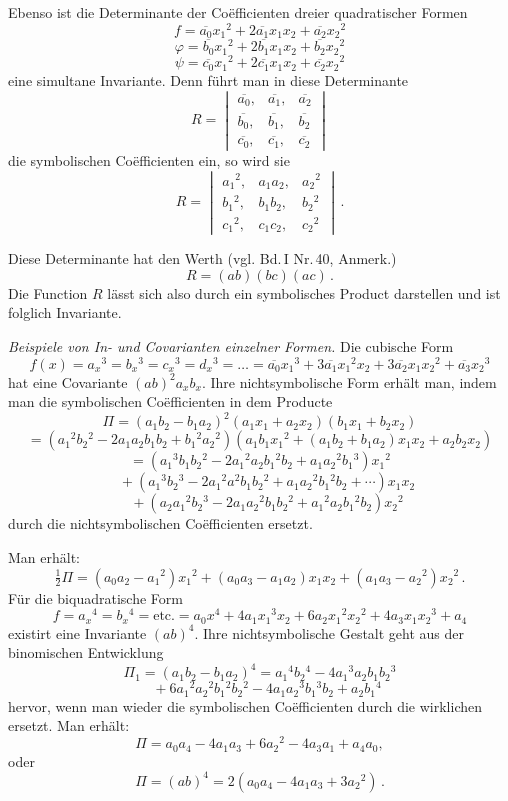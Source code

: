 Ebenso ist die Determinante der Co\"efficienten dreier
quadratischer Formen
\[
f = \overline{a_0}x_1{}^2+2\overline{a_1}x_1x_2+\overline{a_2}x_2{}^2
\]
\[
\varphi = \overline{b_0}x_1{}^2+2\overline{b_1}x_1x_2+\overline{b_2}x_2{}^2
\]
\[
\psi = \overline{c_0}x_1{}^2+2\overline{c_1}x_1x_2+\overline{c_2}x_2{}^2
\]
eine simultane Invariante. Denn führt man in diese Determinante
\[
R = \begin{vmatrix}
\overline{a_0}, & \overline{a_1}, & \overline{a_2}\\
\overline{b_0}, & \overline{b_1}, & \overline{b_2}\\
\overline{c_0}, & \overline{c_1}, & \overline{c_2}
\end{vmatrix}
\]
die symbolischen Co\"efficienten ein, so wird sie
\[
R = \begin{vmatrix}
a_1{}^2, & a_1a_2, & a_2{}^2\\
b_1{}^2, & b_1b_2, & b_2{}^2\\
c_1{}^2, & c_1c_2, & c_2{}^2
\end{vmatrix}\,.
\]


Diese Determinante hat den Werth (vgl. Bd.\,I Nr.\,40, Anmerk.)
\[
R = (ab)(bc)(ac)\,.
\]
Die Function $R$ lässt sich also durch ein symbolisches Product
darstellen und ist folglich Invariante.

\textit{Beispiele von In- und Covarianten einzelner Formen.} Die
cubische Form
\[
f(x) = a_x{}^3 = b_x{}^3 = c_x{}^3 = d_x{}^3 = \ldots =
\overline{a_0}x_1{}^3+3\overline{a_1}x_1{}^2x_2+3\overline{a_2}x_1x_2{}^2+\overline{a_3}x_2{}^3
\]
hat eine Covariante $(ab)^2a_xb_x$. Ihre nichtsymbolische Form
erhält man, indem man die symbolischen Co\"efficienten in dem
Producte
\[
\Pi = (a_1b_2-b_1a_2)^2(a_1x_1+a_2x_2)(b_1x_1+b_2x_2)
\]
\[
= (a_1{}^2b_2{}^2-2a_1a_2b_1b_2+b_1{}^2a_2{}^2)(a_1b_1x_1{}^2+(a_1b_2+b_1a_2)x_1x_2+a_2b_2x_2) %
\]
\[
= (a_1{}^3b_1b_2{}^2-2a_1{}^2a_2b_1{}^2b_2+a_1a_2{}^2b_1{}^3)x_1{}^2
\]
\[
\quad + (a_1{}^3b_2{}^3-2a_1{}^2a^2b_1b_2{}^2+a_1a_2{}^2b_1{}^2b_2+\cdots)x_1x_2 %
\]
\[
\quad + (a_2a_1{}^2b_2{}^3-2a_1a_2{}^2b_1b_2{}^2+a_1{}^2a_2b_1{}^2b_2)x_2{}^2
\]
durch die nichtsymbolischen Co\"efficienten ersetzt.

Man erhält:
\[
\tfrac{1}{2}\Pi = (a_0a_2-a_1{}^2)x_1{}^2+(a_0a_3-a_1a_2)x_1x_2+(a_1a_3-a_2{}^2)x_2{}^2\,.
\]
Für die biquadratische Form
\[
f = a_x{}^4 = b_x{}^4 = \text{etc.} =
a_0x^4+4a_1x_1{}^3x_2+6a_2x_1{}^2x_2{}^2+4a_3x_1x_2{}^3+a_4 %
\]
existirt eine Invariante $(ab)^4$. Ihre nichtsymbolische Gestalt
geht aus der binomischen Entwicklung
\[
\Pi_1 = (a_1b_2-b_1a_2)^4 = a_1{}^4b_2{}^4-4a_1{}^3a_2b_1b_2{}^3
\]
\[
\quad + 6a_1{}^2a_2{}^2b_1{}^2b_2{}^2-4a_1a_2{}^3b_1{}^3b_2+a_2b_1{}^4
\]
hervor, wenn man wieder die symbolischen Co\"efficienten durch
die wirklichen ersetzt. Man erhält:
\[
\Pi = a_0a_4-4a_1a_3+6a_2{}^2-4a_3a_1+a_4a_0,
\]
oder
\[
\Pi = (ab)^4 = 2(a_0a_4-4a_1a_3+3a_2{}^2)\,.
\]

